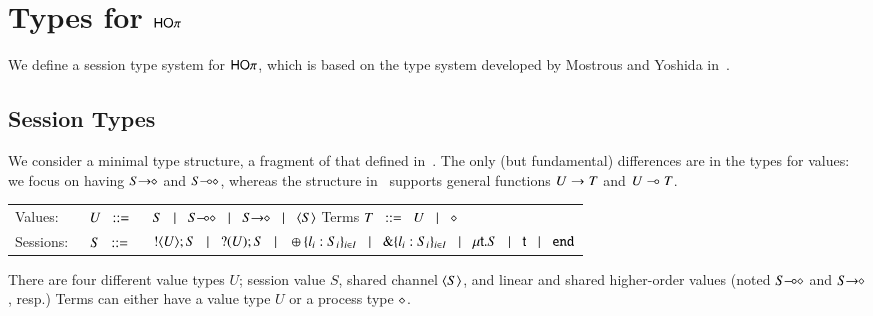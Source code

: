 \newcommand{\jrule}[3]{\displaystyle \trule{#3}~~\frac{#1 }{#2}}
\newcommand{\addenv}{\circ}

\section{Types for $\mathsf{HO}\pi$}

We define a session type system for $\mathsf{HO}\pi$, which is based on the type system
developed by Mostrous and Yoshida in~\cite{tlca07}.

\subsection{Session Types}
We consider a minimal type structure, a fragment of that defined in~\cite{tlca07}.
The only (but fundamental) differences are in the types for values: we focus on having 
$S\!\! \rightarrow\!\! \diamond$ and $S\!\! \multimap\!\! \diamond$, whereas the structure in~\cite{tlca07} supports general functions $U \rightarrow T$ and 
$U \multimap T$.

\begin{tabular}{lcl}
	Values:		& $U \;\;::=\;\; $ & $S \bnfbar \lhot{S} \bnfbar \shot{S} \bnfbar \chtype{S}$ \qquad \quad Terms \quad $T \;\;::=\;\; U  \;\;\;|\;\;\;  \diamond$ \\
	Sessions:\	& $S \;\;::=\;\;$ & $! \langle U \rangle ; S \;\;\;|\;\;\; ? (U) ; S
				\;\;\;|\;\;\; \oplus \{l_i:S_i\}_{i \in I} \;\;\;|\;\;\; \& \{l_i:S_i\}_{i \in I} \;\;\;|\;\;\; \mu\mathsf{t}.S \;\;\;|\;\;\; \mathsf{t}  \;\;\;|\;\;\; \mathtt{end}$
\end{tabular}
\noindent 
There are four different value types $U$; session value $S$, 
shared channel $\langle S \rangle$, and linear and shared higher-order values (noted $S\!\! \multimap\!\! \diamond$ and $S\!\! \rightarrow\!\! \diamond$, resp.)
Terms can either have a value type $U$ or a process type $\diamond$.

